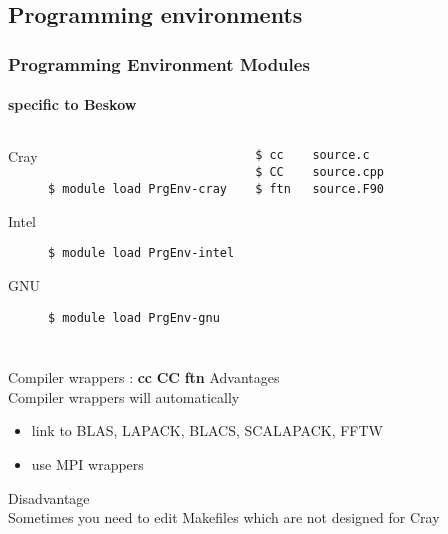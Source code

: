 \subsection{Programming environments}
\begin{frame}[fragile]
  \frametitle{Programming Environment Modules}
  \framesubtitle{specific to \alert{Beskow}}

\begin{columns}[t]
  \begin{description}
  \item [Cray] \verb|$ module load PrgEnv-cray|
  \item [Intel] \verb|$ module load PrgEnv-intel|
  \item [GNU] \verb|$ module load PrgEnv-gnu|
  \end{description}
    \begin{verbatim}
$ cc	source.c
$ CC	source.cpp
$ ftn	source.F90
  \end{verbatim}
\end{columns}
  \begin{exampleblock}{Compiler wrappers : \alert{\textbf{cc} \textbf{CC} \textbf{ftn}}}
    \alert{Advantages}\\
    Compiler wrappers will automatically 
    \begin{itemize}
      \item link to BLAS, LAPACK, BLACS, SCALAPACK, FFTW\\
      \item use MPI wrappers\\
    \end{itemize}
    \alert{Disadvantage}\\
    Sometimes you need to edit Makefiles which are not designed for Cray 
\end{exampleblock}
\end{frame}
